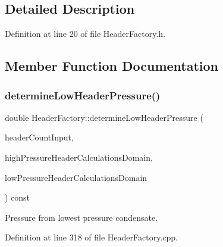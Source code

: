 \subsection{Detailed Description}


Definition at line 20 of file Header\+Factory.\+h.



\subsection{Member Function Documentation}
\mbox{\label{class_header_factory_af015658ac803d2fb4248f59847c40338}} 
\subsubsection{\texorpdfstring{determine\+Low\+Header\+Pressure()}{determineLowHeaderPressure()}}
{\footnotesize\ttfamily double Header\+Factory\+::determine\+Low\+Header\+Pressure (\begin{DoxyParamCaption}\item[{const int}]{header\+Count\+Input,  }\item[{const \hyperlink{class_high_pressure_header_calculations_domain}{High\+Pressure\+Header\+Calculations\+Domain} \&}]{high\+Pressure\+Header\+Calculations\+Domain,  }\item[{const std\+::shared\+\_\+ptr$<$ \hyperlink{class_low_pressure_header_calculations_domain}{Low\+Pressure\+Header\+Calculations\+Domain} $>$ \&}]{low\+Pressure\+Header\+Calculations\+Domain }\end{DoxyParamCaption}) const}

Pressure from lowest pressure condensate. 

Definition at line 318 of file Header\+Factory.\+cpp.

\mbox{\label{class_header_factory_a8e220fb9ed937623e9ca21e27672ec61}} 
